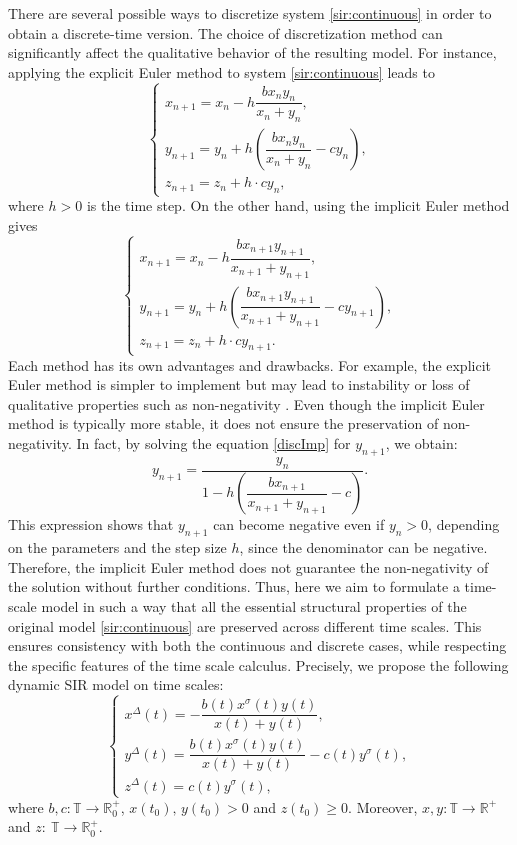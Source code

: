 \documentclass[pdflatex,sn-mathphys-num]{sn-jnl}
\theoremstyle{remark}
\begin{document}
There are several possible ways to discretize system \eqref{sir:continuous} 
in order to obtain a discrete-time version. The choice of discretization method can 
significantly affect the qualitative behavior of the resulting model. For instance, 
applying the explicit Euler method to system \eqref{sir:continuous} leads to
\begin{equation}
\label{discExp}	
\begin{cases}
x_{n+1} = x_n - h \dfrac{b x_n y_n}{x_n + y_n}, \\[10pt]
y_{n+1} = y_n + h \left( \dfrac{b x_n y_n}{x_n + y_n} - c y_n \right), \\[10pt]
z_{n+1} = z_n + h \cdot c y_n,
\end{cases}
\end{equation}
where $ h> 0$ is the time step. On the other hand, 
using the implicit Euler method gives
\begin{equation}
\label{discImp}	
\begin{cases}
x_{n+1} = x_n - h \dfrac{b x_{n+1} y_{n+1}}{x_{n+1} + y_{n+1}}, \\[10pt]
y_{n+1} = y_n + h \left( \dfrac{b x_{n+1} y_{n+1}}{x_{n+1} + y_{n+1}} - c y_{n+1} \right), \\[10pt]
z_{n+1} = z_n + h \cdot c y_{n+1}.
\end{cases}
\end{equation}
Each method has its own advantages and drawbacks. For example, the explicit Euler method 
is simpler to implement but may lead to instability or loss of qualitative properties such 
as non-negativity \cite{Stuart96}. Even though the implicit Euler method is typically more
stable, it does not ensure the preservation of non-negativity. In fact, by solving 
the equation \eqref{discImp} for $y_{n+1}$, we obtain:
$$
y_{n+1} = \frac{y_n}{1 - h \left( \dfrac{b x_{n+1}}{x_{n+1} + y_{n+1}} - c \right)}.
$$
This expression shows that $y_{n+1}$ can become negative even if $y_n > 0$, depending on 
the parameters and the step size $h$, since the denominator can be negative. Therefore, 
the implicit Euler method does not guarantee the non-negativity of the solution without 
further conditions. Thus, here we aim to formulate a time-scale model in such a way that all 
the essential structural properties of the original model \eqref{sir:continuous} 
are preserved across different time scales. 
This ensures consistency with both the continuous and discrete cases, 
while respecting the specific features of the time scale calculus. Precisely, we propose 
the following dynamic SIR model on time scales:
\begin{equation}
\label{dynamic:sir}
\begin{cases}
x^\Delta(t) = -\dfrac{b(t)x^\sigma(t)y(t)}{x(t)+y(t)},\\
y^\Delta(t) = \dfrac{b(t)x^\sigma(t)y(t)}{x(t)+y(t)} - c(t)y^\sigma(t),\\
z^\Delta(t) = c(t)y^\sigma(t),
\end{cases}	
\end{equation}
where $b, c : \mathbb{T} \rightarrow \mathbb{R}_0^+$, $x(t_0),\, y(t_0) > 0$ 
and $z(t_0) \geq 0$. Moreover, $x, y: \mathbb{T} \rightarrow \mathbb{R}^+$ and 
$z:~ \mathbb{T} \rightarrow \mathbb{R}^+_0$. 
\end{document}
